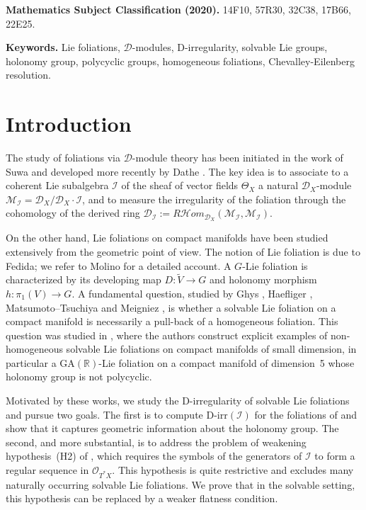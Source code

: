 \documentclass[12pt,a4paper]{article}
\begin{document}
\noindent\textbf{Mathematics Subject Classification (2020).}
14F10, 57R30, 32C38, 17B66, 22E25.

\medskip
\noindent\textbf{Keywords.}
Lie foliations, $\mathcal{D}$-modules, D-irregularity, solvable Lie groups,
holonomy group, polycyclic groups, homogeneous foliations,
Chevalley-Eilenberg resolution.

\section{Introduction}

The study of foliations via $\mathcal{D}$-module theory has been initiated in
the work of Suwa \cite{S90} and developed more recently by Dathe \cite{D16}.
The key idea is to associate to a coherent Lie subalgebra $\mathcal{I}$ of the
sheaf of vector fields $\Theta_X$ a natural $\mathcal{D}_X$-module
$\mathcal{M}_{\mathcal{I}} = \mathcal{D}_X / \mathcal{D}_X \cdot \mathcal{I}$,
and to measure the irregularity of the foliation through the cohomology of the
derived ring
$\mathcal{D}_{\mathcal{I}} :=
R\mathcal{H}om_{\mathcal{D}_X}(\mathcal{M}_{\mathcal{I}},
\mathcal{M}_{\mathcal{I}})$.

On the other hand, Lie foliations on compact manifolds have been studied
extensively from the geometric point of view. The notion of Lie foliation is
due to Fedida; we refer to Molino \cite{Mo88} for a detailed account.
A $G$-Lie foliation is characterized by its developing map
$D: \widetilde{V} \to G$ and holonomy morphism $h: \pi_1(V) \to G$.
A fundamental question, studied by Ghys \cite{G88}, Haefliger \cite{H84},
Matsumoto--Tsuchiya \cite{MT92} and Meigniez \cite{Me95}, is whether a
solvable Lie foliation on a compact manifold is necessarily a pull-back of a
homogeneous foliation. This question was studied in \cite{DN11}, where the
authors construct explicit examples of non-homogeneous solvable Lie foliations
on compact manifolds of small dimension, in particular a
$\mathrm{GA}(\mathbb{R})$-Lie foliation on a compact manifold of dimension~5
whose holonomy group is not polycyclic.

Motivated by these works, we study the D-irregularity of solvable Lie foliations
and pursue two goals. The first is to compute
$\mathrm{D\text{-}irr}(\mathcal{I})$ for the foliations of \cite{DN11} and
show that it captures geometric information about the holonomy group. The second,
and more substantial, is to address the problem of weakening hypothesis~(H2) of
\cite{D16}, which requires the symbols of the generators of $\mathcal{I}$ to
form a regular sequence in $\mathcal{O}_{T^*X}$. This hypothesis is quite
restrictive and excludes many naturally occurring solvable Lie foliations. We
prove that in the solvable setting, this hypothesis can be replaced by a weaker
flatness condition.
\end{document}
